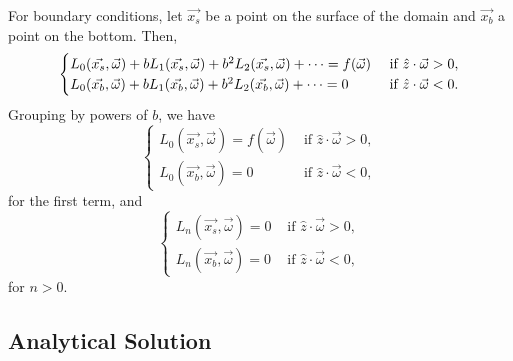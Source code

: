 For boundary conditions, let $\vec{x_s}$ be a point on the surface of the domain and $\vec{x_b}$ a point on the bottom.
Then,
\begin{equation*}
  \begin{cases}
    L_0(\vec{x_s},\vec{\omega}) + b L_1(\vec{x_s},\vec{\omega}) + b^2 L_2(\vec{x_s},\vec{\omega}) + \cdots = f(\vec{\omega}) &\mbox{ if } \hat{z}\cdot\vec{\omega} > 0, \\
    L_0(\vec{x_b},\vec{\omega}) + b L_1(\vec{x_b},\vec{\omega}) + b^2 L_2(\vec{x_b},\vec{\omega}) + \cdots = 0 &\mbox{ if } \hat{z}\cdot\vec{\omega} < 0.
    \end{cases}
\end{equation*}
Grouping by powers of $b$, we have
\begin{equation}
  \begin{cases}
    L_0(\vec{x_s}, \vec{\omega}) = f(\vec{\omega}) &\mbox{ if } \hat{z}\cdot\vec{\omega} > 0, \\
    L_0(\vec{x_b}, \vec{\omega}) = 0 &\mbox{ if } \hat{z}\cdot\vec{\omega} < 0,
  \end{cases}
  \label{eqn:asymptotics_bc_0}
\end{equation}
for the first term, and
\begin{equation}
  \begin{cases}
    L_n(\vec{x_s}, \vec{\omega}) = 0 &\mbox{ if } \hat{z}\cdot\vec{\omega} > 0, \\
    L_n(\vec{x_b}, \vec{\omega}) = 0 &\mbox{ if } \hat{z}\cdot\vec{\omega} < 0,
  \end{cases}
  \label{eqn:asymptotics_bc_n}
\end{equation}
for $n > 0$.

\subsection{Analytical Solution}
\label{sec:asymptotic_sol}

